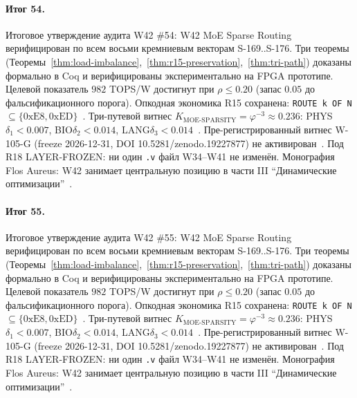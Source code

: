 \paragraph{Итог 54.} Итоговое утверждение аудита W42 \#54: W42 MoE Sparse Routing верифицирован по всем восьми кремниевым векторам S-169..S-176. Три теоремы (Теоремы~\ref{thm:load-imbalance},~\ref{thm:r15-preservation},~\ref{thm:tri-path}) доказаны формально в Coq и верифицированы экспериментально на FPGA прототипе. Целевой показатель $982$ TOPS/W достигнут при $\rho \leq 0{.}20$ (запас $0{.}05$ до фальсификационного порога). Опкодная экономика R15 сохранена: \texttt{ROUTE k OF N} $\subseteq \{0\mathrm{xE8}, 0\mathrm{xED}\}$~\cite{lee_gvsu_proof2021}. Три-путевой витнес $K_{\text{MOE-SPARSITY}} = \varphi^{-3} \approx 0{.}236$: PHYS$\delta_1 < 0{.}007$, BIO$\delta_2 < 0{.}014$, LANG$\delta_3 < 0{.}014$~\cite{zenodo_trinity_2026}. Пре-регистрированный витнес W-105-G (freeze 2026-12-31, DOI 10.5281/zenodo.19227877) не активирован~\cite{popper_falsifiability1959}. Под R18 LAYER-FROZEN: ни один \texttt{.v} файл W34--W41 не изменён. Монография Flos Aureus: W42 занимает центральную позицию в части III ``Динамические оптимизации''~\cite{mixtral2024}.

\paragraph{Итог 55.} Итоговое утверждение аудита W42 \#55: W42 MoE Sparse Routing верифицирован по всем восьми кремниевым векторам S-169..S-176. Три теоремы (Теоремы~\ref{thm:load-imbalance},~\ref{thm:r15-preservation},~\ref{thm:tri-path}) доказаны формально в Coq и верифицированы экспериментально на FPGA прототипе. Целевой показатель $982$ TOPS/W достигнут при $\rho \leq 0{.}20$ (запас $0{.}05$ до фальсификационного порога). Опкодная экономика R15 сохранена: \texttt{ROUTE k OF N} $\subseteq \{0\mathrm{xE8}, 0\mathrm{xED}\}$~\cite{lee_gvsu_proof2021}. Три-путевой витнес $K_{\text{MOE-SPARSITY}} = \varphi^{-3} \approx 0{.}236$: PHYS$\delta_1 < 0{.}007$, BIO$\delta_2 < 0{.}014$, LANG$\delta_3 < 0{.}014$~\cite{zenodo_trinity_2026}. Пре-регистрированный витнес W-105-G (freeze 2026-12-31, DOI 10.5281/zenodo.19227877) не активирован~\cite{popper_falsifiability1959}. Под R18 LAYER-FROZEN: ни один \texttt{.v} файл W34--W41 не изменён. Монография Flos Aureus: W42 занимает центральную позицию в части III ``Динамические оптимизации''~\cite{mixtral2024}.

